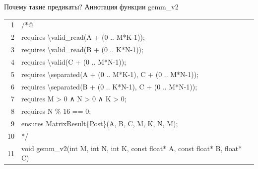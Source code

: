\documentclass[aspectratio=169, 11pt]{beamer}
\newcommand{\AK}[1]{\textcolor{acslkw}{#1}}   %
\newcommand{\AT}[1]{\textcolor{acslty}{#1}}   %
\newcommand{\AI}[1]{\textcolor{acslid}{#1}}   %
\newcommand{\AN}[1]{\textcolor{acslnm}{#1}}   %
\newcommand{\AL}[1]{\textcolor{acsllg}{#1}}   %
\newcommand{\AC}[1]{\textcolor{acslcm}{#1}}   %
\newcommand{\ALB}[1]{\textcolor{acsllb}{#1}}  %
\begin{document}
\begin{frame}[fragile]{Почему такие предикаты? Аннотация функции gemm\_v2}
	\ttfamily\small
	\setlength{\baselineskip}{1.15em}
	\setlength{\parindent}{0pt}
	
	\begingroup
	\setlength{\fboxsep}{0pt}%
	\colorbox{codebg}{%
		\begin{minipage}{\linewidth}
			\vspace{6pt}%
			\hspace{8pt}%
			\begin{tabular}{@{}r@{\hspace{1.2em}}l@{}}
				\textcolor{ln}{1} & \AC{/*@} \\
				\textcolor{ln}{2} & \hspace{2em}\AK{requires} \AI{\textbackslash valid\_read}(\AI{A} \AL{+} (\AN{0} \AL{..} \AI{M}\AI{*}\AI{K}\AN{-1})); \\
				\textcolor{ln}{3} & \hspace{2em}\AK{requires} \AI{\textbackslash valid\_read}(\AI{B} \AL{+} (\AN{0} \AL{..} \AI{K}\AI{*}\AI{N}\AN{-1})); \\
				\textcolor{ln}{4} & \hspace{2em}\AK{requires} \AI{\textbackslash valid}(\AI{C} \AL{+} (\AN{0} \AL{..} \AI{M}\AI{*}\AI{N}\AN{-1})); \\
				\textcolor{ln}{5} & \hspace{2em}\AK{requires} \AI{\textbackslash separated}(\AI{A} \AL{+} (\AN{0} \AL{..} \AI{M}\AI{*}\AI{K}\AN{-1}), \AI{C} \AL{+} (\AN{0} \AL{..} \AI{M}\AI{*}\AI{N}\AN{-1})); \\
				\textcolor{ln}{6} & \hspace{2em}\AK{requires} \AI{\textbackslash separated}(\AI{B} \AL{+} (\AN{0} \AL{..} \AI{K}\AI{*}\AI{N}\AN{-1}), \AI{C} \AL{+} (\AN{0} \AL{..} \AI{M}\AI{*}\AI{N}\AN{-1})); \\
				\textcolor{ln}{7} & \hspace{2em}\AK{requires} \AI{M} \AL{>} \AN{0} \AL{∧} \AI{N} \AL{>} \AN{0} \AL{∧} \AI{K} \AL{>} \AN{0}; \\
				\textcolor{ln}{8} & \hspace{2em}\AK{requires} \AI{N} \AL{\%} \AN{16} \AL{==} \AN{0}; \\
				\textcolor{ln}{9} & \hspace{2em}\AK{ensures} \AI{MatrixResult}\{\ALB{Post}\}(\AI{A}, \AI{B}, \AI{C}, \AI{M}, \AI{K}, \AI{N}, \AI{M}); \\
				\textcolor{ln}{10} & \AC{*/} \\
				\textcolor{ln}{11} & \AK{void} \AI{gemm\_v2}(\AT{int} \AI{M}, \AT{int} \AI{N}, \AT{int} \AI{K}, \AT{const} \AT{float*} \AI{A}, \AT{const} \AT{float*} \AI{B}, \AT{float*} \AI{C}) \\
			\end{tabular}
			\hspace{8pt}%
			\vspace{4pt}%
		\end{minipage}%
	}%
	\endgroup
\end{frame}
\end{document}
